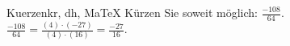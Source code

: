 \begin{MAufgabe}{Kuerzen}{kr, dh, MaTeX}
K\"urzen Sie soweit m\"oglich: $\frac{-108}{64}$.\\ 
\ifLsg\MLoesung
\quad $\frac{-108}{64}=\frac{(4)\cdot(-27)}{(4)\cdot(16)}=\frac{-27}{16}$.\else\relax\fi
 \end{MAufgabe}
